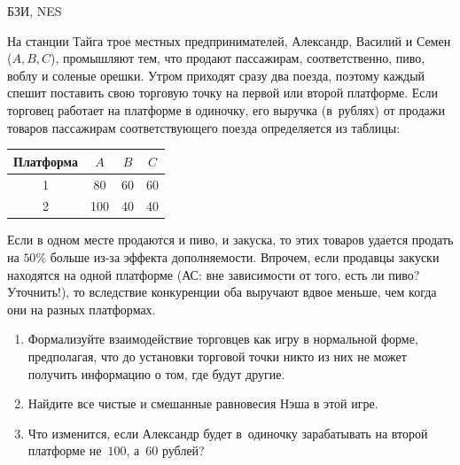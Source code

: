 \begin{problem}
\begin{source}
БЗИ, NES
\end{source} На станции Тайга трое
местных предпринимателей, Александр, Василий и Семен
($A,B,C$), промышляют тем, что продают пассажирам,
соответственно, пиво, воблу и соленые орешки. Утром
приходят сразу два поезда, поэтому каждый спешит поставить
свою торговую точку на первой или второй платформе. Если
торговец работает на платформе в одиночку, его выручка
(в~рублях) от продажи товаров пассажирам соответствующего
поезда определяется из таблицы:
\begin{center}
\begin{tabular}{|c|ccc|}
\hline Платформа&$A$&$B$&$C$\\ \hline 1&80&60&60\\ 2&100&40&40\\
\hline
\end{tabular}
\end{center}
Если в одном месте продаются и пиво, и закуска, то этих
товаров удается продать на $50\%$ больше из-за эффекта
дополняемости. Впрочем, если продавцы закуски находятся на
одной платформе ({\red АС: вне зависимости от того, есть ли пиво? Уточнить!}), то вследствие конкуренции оба выручают
вдвое меньше, чем когда они на разных платформах.
\begin{enumerate}

\item Формализуйте взаимодействие торговцев как игру в
нормальной форме, предполагая, что до установки торговой
точки никто из них не может получить информацию о том, где
будут другие.

\item Найдите все чистые и смешанные равновесия Нэша в этой
игре.

\item Что изменится, если Александр будет в~одиночку
зарабатывать на второй платформе не~$100$, а~$60$ рублей?

\end{enumerate}







\begin{sol}

\end{sol}
\end{problem}




